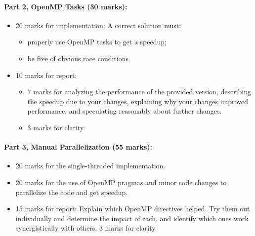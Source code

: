 \documentclass[letterpaper,10pt]{article}
\begin{document}
\paragraph{Part 2, OpenMP Tasks (30 marks):} 

\begin{itemize}
\item 20 marks for implementation: A correct solution must:
\begin{itemize}
	\item properly use OpenMP tasks to get a speedup;
	\item be free of obvious race conditions.
\end{itemize}
\item 10 marks for report: 
\begin{itemize}
\item 7 marks for analyzing the performance
of the provided version, describing the speedup due to your
changes, explaining why your changes improved performance, and
speculating reasonably about further changes. 
\item 3 marks for clarity.
\end{itemize}
\end{itemize}

\paragraph{Part 3, Manual Parallelization (55 marks):} 
\begin{itemize}
\item 20 marks for the single-threaded implementation. 

\item 20 marks for the use of OpenMP pragmas and minor code changes to parallelize the code and get speedup.

\item 15 marks for report: Explain which OpenMP directives helped. Try them out individually and determine the impact of each, and identify which ones work synergistically with others. 3 marks for clarity.
\end{itemize}
\end{document}
